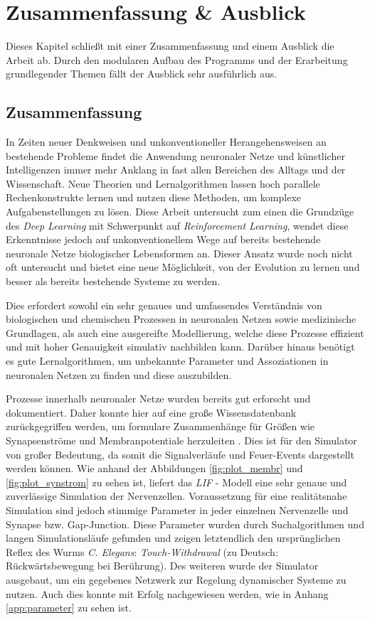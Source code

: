 %
\chapter{Zusammenfassung \& Ausblick}
\label{chap:zsm}
%
	Dieses Kapitel schließt mit einer Zusammenfassung und einem Ausblick die Arbeit ab. Durch den modularen Aufbau des Programms und der Erarbeitung grundlegender Themen fällt der Ausblick sehr ausführlich aus.

\section{Zusammenfassung}
\label{sec:erg_zsm}
	In Zeiten neuer Denkweisen und unkonventioneller Herangehensweisen an bestehende Probleme findet die Anwendung neuronaler Netze und künstlicher Intelligenzen immer mehr Anklang in fast allen Bereichen des Alltags und der Wissenschaft. Neue Theorien und Lernalgorithmen lassen hoch parallele Rechenkonstrukte lernen und nutzen diese Methoden, um komplexe Aufgabenstellungen zu lösen. Diese Arbeit untersucht zum einen die Grundzüge des \textit{Deep Learning} mit Schwerpunkt auf \textit{Reinforcement Learning}, wendet diese Erkenntnisse jedoch auf unkonventionellem Wege auf bereits bestehende neuronale Netze biologischer Lebensformen an. Dieser Ansatz wurde noch nicht oft untersucht und bietet eine neue Möglichkeit, von der Evolution zu lernen und besser als bereits bestehende Systeme zu werden.
	
	Dies erfordert sowohl ein sehr genaues und umfassendes Verständnis von biologischen und chemischen Prozessen in neuronalen Netzen sowie medizinische Grundlagen, als auch eine ausgereifte Modellierung, welche diese Prozesse effizient und mit hoher Genauigkeit simulativ nachbilden kann. Darüber hinaus benötigt es gute Lernalgorithmen, um unbekannte Parameter und Assoziationen in neuronalen Netzen zu finden und diese auszubilden.
	
	Prozesse innerhalb neuronaler Netze wurden bereits gut erforscht und dokumentiert. Daher konnte hier auf eine große Wissensdatenbank zurückgegriffen werden, um formulare Zusammenhänge für Größen wie Synapsenströme und Membranpotentiale herzuleiten \cite{NeuronalDynamics}. Dies ist für den Simulator von großer Bedeutung, da somit die Signalverläufe und Feuer-Events dargestellt werden können. Wie anhand der Abbildungen \ref{fig:plot_membr} und \ref{fig:plot_synstrom} zu sehen ist, liefert das \textit{LIF} - Modell eine sehr genaue und zuverlässige Simulation der Nervenzellen. Voraussetzung für eine realitätsnahe Simulation sind jedoch stimmige Parameter in jeder einzelnen Nervenzelle und Synapse bzw. Gap-Junction. Diese Parameter wurden durch Suchalgorithmen und langen Simulationsläufe gefunden und zeigen letztendlich den ursprünglichen Reflex des Wurms \textit{C. Elegans}: \textit{Touch-Withdrawal} (zu Deutsch: Rückwärtsbewegung bei Berührung). Des weiteren wurde der Simulator ausgebaut, um ein gegebenes Netzwerk zur Regelung dynamischer Systeme zu nutzen. Auch dies konnte mit Erfolg nachgewiesen werden, wie in Anhang \ref{app:parameter} zu sehen ist.
	
